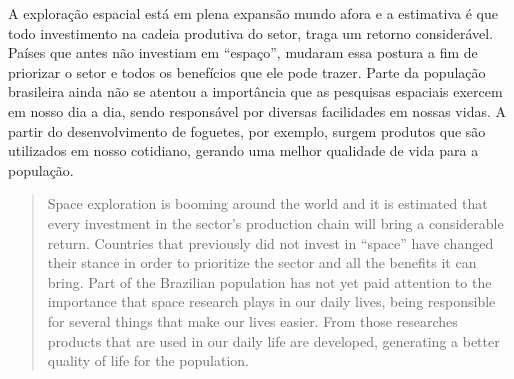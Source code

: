 \begin{resumo} 
    A exploração espacial está em plena expansão mundo afora e a estimativa é que todo investimento na cadeia produtiva do setor, traga um retorno considerável. Países que antes não investiam em “espaço”, mudaram essa postura a fim de priorizar o setor e todos os benefícios que ele pode trazer.
    Parte da população brasileira ainda não se atentou a importância que as pesquisas espaciais exercem em nosso dia a dia, sendo responsável por diversas facilidades em nossas vidas. A partir do desenvolvimento de foguetes, por exemplo, surgem produtos que são utilizados em nosso cotidiano, gerando uma melhor qualidade de vida para a população.
  \end{resumo}
  
  \begin{abstract}
    Space exploration is booming around the world and it is estimated that every investment in the sector's production chain will bring a considerable return. Countries that previously did not invest in “space” have changed their stance in order to prioritize the sector and all the benefits it can bring.
    Part of the Brazilian population has not yet paid attention to the importance that space research plays in our daily lives, being responsible for several things that make our lives easier. From those researches products that are used in our daily life are developed, generating a better quality of life for the population.
  \end{abstract}